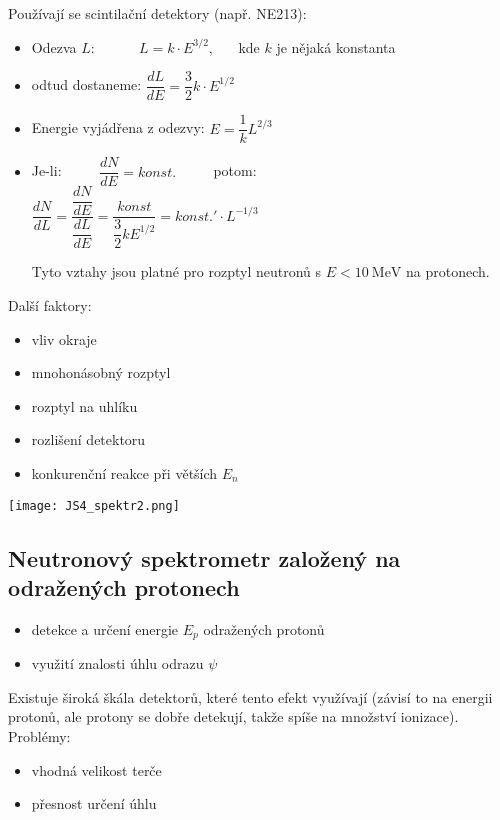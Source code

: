 \documentclass[../../main.tex]{subfiles}
\begin{document}
Používají se scintilační detektory (např. NE213):
\begin{itemize}
    \item Odezva $L$: ~~~~~ $L = k \cdotp E^{3/2}$, ~~~kde $k$ je nějaká konstanta
    \item odtud dostaneme: $\dfrac{dL}{dE} = \dfrac{3}{2} k \cdotp E^{1/2}$
    \item Energie vyjádřena z odezvy: $ E = \dfrac{1}{k} L^{2/3}$
    \item Je-li: ~~~~ $\dfrac{dN}{dE} = konst.$ ~~~~ potom: ~~~~ $\dfrac{dN}{dL} = \dfrac{\dfrac{dN}{dE}}{\dfrac{dL}{dE}}= \dfrac{konst}{\dfrac{3}{2} k E^{1/2}} = konst.' \cdotp L^{-1/3}$
    
    Tyto vztahy jsou platné pro rozptyl neutronů s $E < 10 ~\mathrm{MeV}$ na protonech.
\end{itemize}
Další faktory: 
\begin{itemize}
	\item vliv okraje
	\item mnohonásobný rozptyl
	\item rozptyl na uhlíku
	\item rozlišení detektoru
	\item konkurenční reakce při větších $E_n$
\end{itemize}

\begin{center}
	\texttt{[image: JS4\_spektr2.png]}
\end{center}

\subsection{Neutronový spektrometr založený na odražených protonech}

\begin{itemize}
	\item detekce a určení energie $E_p$ odražených protonů
	\item využití znalosti úhlu odrazu $\psi$
\end{itemize}

Existuje široká škála detektorů, které tento efekt využívají (závisí to na energii protonů, ale protony se dobře detekují, takže spíše na množství ionizace). 
Problémy:
\begin{itemize}
	\item vhodná velikost terče
	\item přesnost určení úhlu
\end{itemize}
\end{document}
